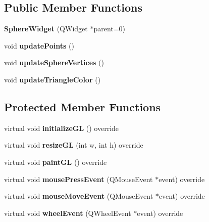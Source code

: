 \subsection*{Public Member Functions}
\begin{DoxyCompactItemize}
\item 
\mbox{\label{class_sphere_widget_a6ee7b3a4b58e5d62fb1c901aafdd1790}} 
{\bfseries Sphere\+Widget} (Q\+Widget $\ast$parent=0)
\item 
\mbox{\label{class_sphere_widget_a692ca1c1e7556f6abd7b5f6a49a2557c}} 
void {\bfseries update\+Points} ()
\item 
\mbox{\label{class_sphere_widget_a7d132800fb4d6b7b925c253679bb6445}} 
void {\bfseries update\+Sphere\+Vertices} ()
\item 
\mbox{\label{class_sphere_widget_a871c5252a7a218c5d405be5dfc3dbfa1}} 
void {\bfseries update\+Triangle\+Color} ()
\end{DoxyCompactItemize}
\subsection*{Protected Member Functions}
\begin{DoxyCompactItemize}
\item 
\mbox{\label{class_sphere_widget_a323d335cf261b7156da1a59aaf28c40c}} 
virtual void {\bfseries initialize\+GL} () override
\item 
\mbox{\label{class_sphere_widget_aaf11c928f52c91d7f60317922df7ca73}} 
virtual void {\bfseries resize\+GL} (int w, int h) override
\item 
\mbox{\label{class_sphere_widget_a122b798a2eb0c251f53671009abdf8c8}} 
virtual void {\bfseries paint\+GL} () override
\item 
\mbox{\label{class_sphere_widget_ac658d6e1cdc99280ecff045f92fe1ba3}} 
virtual void {\bfseries mouse\+Press\+Event} (Q\+Mouse\+Event $\ast$event) override
\item 
\mbox{\label{class_sphere_widget_aef63eed14a55be78015576296dce516e}} 
virtual void {\bfseries mouse\+Move\+Event} (Q\+Mouse\+Event $\ast$event) override
\item 
\mbox{\label{class_sphere_widget_aaecd84d746763a4bd6f46a6d55a36d84}} 
virtual void {\bfseries wheel\+Event} (Q\+Wheel\+Event $\ast$event) override
\end{DoxyCompactItemize}


